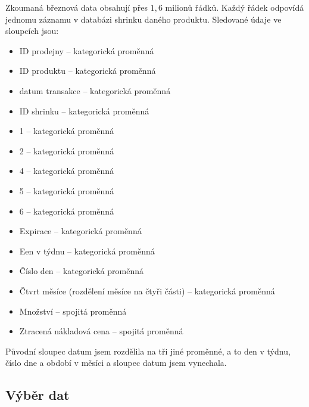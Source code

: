 Zkoumaná březnová data obsahují přes $1{,6}$ milionů řádků.
Každý řádek odpovídá jednomu záznamu v databázi shrinku daného produktu. Sledované údaje ve sloupcích jsou: 
\begin{itemize}
    \itemsep-0.34em
    \item ID prodejny -- kategorická proměnná
    \item ID produktu -- kategorická proměnná
    \item datum transakce -- kategorická proměnná
    \item ID shrinku -- kategorická proměnná
    \item 1 -- kategorická proměnná
    \item 2 -- kategorická proměnná
    \item 4 -- kategorická proměnná
    \item 5 -- kategorická proměnná
    \item 6 -- kategorická proměnná
    \item Expirace -- kategorická proměnná
    \item Een v týdnu -- kategorická proměnná
    \item Číslo den -- kategorická proměnná
    \item Čtvrt měsíce (rozdělení měsíce na čtyři části) -- kategorická proměnná
    \item Množství -- spojitá proměnná
    \item Ztracená nákladová cena -- spojitá proměnná
\end{itemize}
Původní sloupec datum jsem rozdělila na tři jiné proměnné, a to den v týdnu, číslo dne a období v měsíci a sloupec datum jsem vynechala. 



\subsection{Výběr dat}

